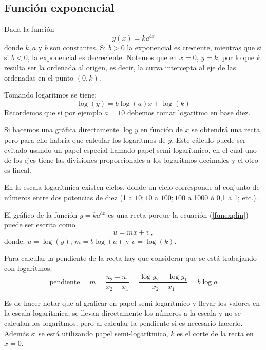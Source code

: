 \subsection{Funci\'on exponencial}
Dada la funci\'on 
\begin{equation}
y(x)=k a^{b x}
\label{funexp}
\end{equation}
donde $k, a$ y $b$ son constantes. Si  $b>0$  la exponencial es creciente, mientras que si si $b < 0$, la exponencial es decreciente. Notemos  que en $x=0$, $y=k$, por lo que $k$ resulta ser la ordenada al origen, es decir, la curva intercepta al eje de las ordenadas en el punto $(0, k)$.

Tomando logaritmos se tiene:
\begin{equation}
\log (y)=b \log(a) x +\log (k)
\label{funexplin}
\end{equation}
Recordemos que si por ejemplo $a=10$ debemos tomar  logaritmo en base diez. 

Si hacemos una gr\'afica directamente $\log y$ en funci\'on de $x$  se obtendr\'a una recta, pero para ello habr\'ia que calcular los logaritmos de $y$. Este c\'alculo puede ser evitado usando un papel especial llamado papel semi-logar\'itmico, en el cual uno de los ejes tiene las divisiones proporcionales a los logaritmos decimales y el otro es lineal. 

En la escala logar\'itmica existen ciclos, donde un ciclo corresponde al conjunto de n\'umeros entre dos potencias de diez (1 a $10; 10$ a $100; 100$ a 1000 \'o 0,1 a 1; etc.).

El gr\'afico de la funci\'on $y=k a^{bx}$ es una recta porque la ecuaci\'on (\ref{funexplin}) puede ser escrita como
$$
u=m x+v \,,
$$
donde: $u =\log(y)$,  $m =b \log(a)$ y  $v=\log (k)$.

Para calcular la pendiente de la recta hay que considerar que se est\'a trabajando con logaritmos:
$$
\text {pendiente}=m=\frac{u_2-u_1}{x_2-x_1}  =\frac{\log y_2-\log y_1}{x_2-x_1}=b \log a
$$

Es de hacer notar que al graficar en papel semi-logar\'itmico y llevar los valores en la escala logar\'itmica, se llevan directamente los n\'umeros a la escala y no se calculan los logaritmos, pero al calcular la pendiente si es necesario hacerlo. Adem\'as si se est\'a utilizando papel semi-logar\'itmico, $k$ es el corte de la recta en $x=0$.

